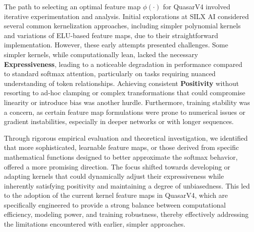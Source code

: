 \documentclass{article}
\begin{document}
The path to selecting an optimal feature map $\phi(\cdot)$ for QuasarV4 involved iterative experimentation and analysis. Initial explorations at SILX AI considered several common kernelization approaches, including simpler polynomial kernels and variations of ELU-based feature maps, due to their straightforward implementation. However, these early attempts presented challenges. Some simpler kernels, while computationally lean, lacked the necessary \textbf{Expressiveness}, leading to a noticeable degradation in performance compared to standard softmax attention, particularly on tasks requiring nuanced understanding of token relationships. Achieving consistent \textbf{Positivity} without resorting to ad-hoc clamping or complex transformations that could compromise linearity or introduce bias was another hurdle. Furthermore, training stability was a concern, as certain feature map formulations were prone to numerical issues or gradient instabilities, especially in deeper networks or with longer sequences.

\begin{table*}[t]
    \centering
    \caption{Comparison of Attention Mechanisms. QuasarV4 combines the O(1) decoding of linear attention with an expressive recurrent memory, maintaining linear training complexity while being data-dependent for enhanced modeling.}
    \label{tab:arch_comparison}
    \end{table*}

Through rigorous empirical evaluation and theoretical investigation, we identified that more sophisticated, learnable feature maps, or those derived from specific mathematical functions designed to better approximate the softmax behavior, offered a more promising direction. The focus shifted towards developing or adapting kernels that could dynamically adjust their expressiveness while inherently satisfying positivity and maintaining a degree of unbiasedness. This led to the adoption of the current kernel feature maps in QuasarV4, which are specifically engineered to provide a strong balance between computational efficiency, modeling power, and training robustness, thereby effectively addressing the limitations encountered with earlier, simpler approaches.
\end{document}
